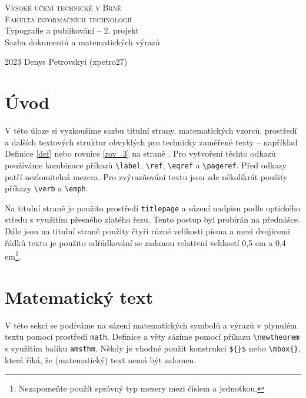 \documentclass[a4paper, twocolumn, 11pt]{article}
\theoremstyle{definition}
\theoremstyle{definition}
\begin{document}
    \begin{titlepage}
        \begin{center}
            {\Huge\textsc{Vysoké učení technické v Brně} \\ [0.5em]}
            \huge
            \textsc{Fakulta informačních technologií}\\
                \LARGE
                Typografie a publikování -- 2. projekt \\ [0.4em]
                Sazba dokumentů a matematických výrazů
        \end{center}
        {\Large 2023 \hfill Denys Petrovskyi (xpetro27)}
    \end{titlepage}

    \section*{Úvod}\label{page}

    V této úloze si vyzkoušíme sazbu titulní strany, matematických vzorců, 
    prostředí a dalších textových struktur obvyklých pro technicky zaměřené 
    texty -- například Definice \ref{def} nebo rovnice \eqref{rov_3} na straně \pageref{page}.
    Pro vytvoření těchto odkazů používáme kombinace příkazů \verb|\label|, \verb|\ref|, \verb|\eqref| a \verb|\pageref|.
    Před odkazy patří nezlomitelná mezera. Pro zvýrazňování textu jsou zde několikrát použity příkazy \verb|\verb| a \verb|\emph|.
    \par Na titulní straně je použito prostředí \verb|titlepage| a sázení nadpisu podle optického středu s využitím přesného zlatého řezu.
    Tento postup byl probírán na přednášce. Dále jsou na titulní straně použity čtyři různé velikosti písma a mezi dvojicemi 
    řádků textu je použito odřádkování se zadanou relativní velikostí 0,5 em a 0,4 em\footnote[1]{Nezapomeňte použít správný typ mezery mezi číslem a jednotkou.}.

    \section{Matematický text}

    V této sekci se podíváme na sázení matematických symbolů a výrazů v plynulém textu pomocí prostředí \verb|math|.
    Definice a věty sázíme pomocí příkazu \verb|\newtheorem| s využitím balíku \verb|amsthm|.
    Někdy je vhodné použít konstrukci \verb|${}$| nebo \verb|\mbox{}|, která říká, že (matematický) text nemá být zalomen.
\end{document}
